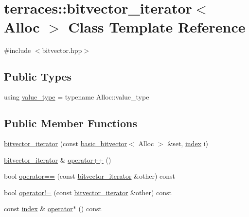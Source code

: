 \hypertarget{classterraces_1_1bitvector__iterator}{}\section{terraces\+:\+:bitvector\+\_\+iterator$<$ Alloc $>$ Class Template Reference}
\label{classterraces_1_1bitvector__iterator}


{\ttfamily \#include $<$bitvector.\+hpp$>$}

\subsection*{Public Types}
\begin{DoxyCompactItemize}
\item 
using \hyperlink{classterraces_1_1bitvector__iterator_a8156fa80ed2f7604e66ed92516064472}{value\+\_\+type} = typename Alloc\+::value\+\_\+type
\end{DoxyCompactItemize}
\subsection*{Public Member Functions}
\begin{DoxyCompactItemize}
\item 
\hyperlink{classterraces_1_1bitvector__iterator_afebccf304754e00d27e87508c4e43a4c}{bitvector\+\_\+iterator} (const \hyperlink{classterraces_1_1basic__bitvector}{basic\+\_\+bitvector}$<$ Alloc $>$ \&set, \hyperlink{namespaceterraces_adbc33ccb543d1634e96d0eb02e472c77}{index} i)
\item 
\hyperlink{classterraces_1_1bitvector__iterator}{bitvector\+\_\+iterator} \& \hyperlink{classterraces_1_1bitvector__iterator_ae20702cafbc74443374d264031481b30}{operator++} ()
\item 
bool \hyperlink{classterraces_1_1bitvector__iterator_a33e2ed2d92f8b24558f758ba340d384d}{operator==} (const \hyperlink{classterraces_1_1bitvector__iterator}{bitvector\+\_\+iterator} \&other) const
\item 
bool \hyperlink{classterraces_1_1bitvector__iterator_aacb89a9a24c74fcaadefff23a5016ce0}{operator!=} (const \hyperlink{classterraces_1_1bitvector__iterator}{bitvector\+\_\+iterator} \&other) const
\item 
const \hyperlink{namespaceterraces_adbc33ccb543d1634e96d0eb02e472c77}{index} \& \hyperlink{classterraces_1_1bitvector__iterator_ae71cae069ce0644f658f71763b65c49d}{operator$\ast$} () const
\end{DoxyCompactItemize}


